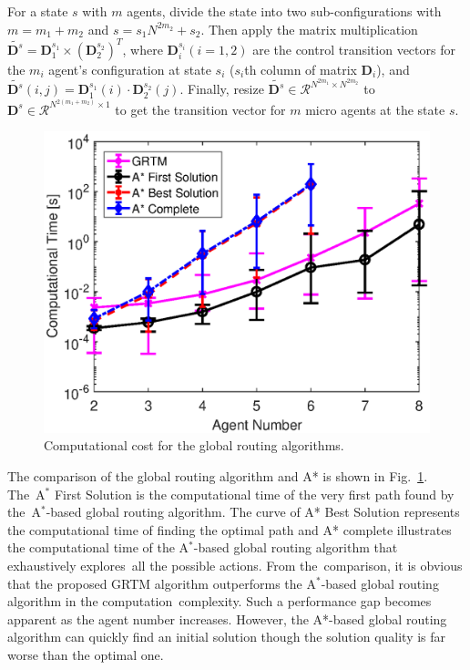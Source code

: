 \documentclass[conference, onecolumn]{IEEEtran}
\begin{document}
For a state $s$ with $m$ agents, divide the state into two sub-configurations with $m=m_1 + m_2$ and $s = s_1N^{2m_2}+s_2$. Then apply the matrix multiplication $\widetilde{\textbf{D}^s} = \textbf{D}_1^{s_1} \times (\textbf{D}_2^{s_2})^T$, where $\textbf{D}_i^{s_i}(i=1,2)$ are the control transition vectors for the $m_i$ agent's configuration at state $s_i$ ($s_i$th column of matrix $\textbf{D}_i$), and $\widetilde{\textbf{D}^s}(i,j) = \textbf{D}_1^{s_1}(i) \cdot \textbf{D}_2^{s_2}(j)$. Finally, resize $\widetilde{\textbf{D}^s}\in \mathcal{R}^{N^{2m_1} \times N^{2m_2}}$ to $\textbf{D}^s \in \mathcal{R}^{N^{2(m_1+m_2)} \times 1}$ to get the transition vector for $m$ micro agents at the state $s$.

\begin{figure}[thb!]

	\centering
	\includegraphics[scale=0.6]{globalroute}
	\caption{Computational cost for the global routing algorithms. }
	\label{globalroutefig}
\end{figure}


The comparison of the global routing algorithm and A* is shown in Fig.~\ref{globalroutefig}. The A$^*$ First Solution is the computational time of the very first path found by the A$^*$-based global routing algorithm. The curve of A* Best Solution represents the computational time of finding the optimal path and A* complete illustrates the computational time of the A$^*$-based global routing algorithm that exhaustively explores all the possible actions. From the comparison, it is obvious that the proposed GRTM algorithm outperforms the A$^*$-based global routing algorithm in the computation complexity. Such a performance gap becomes apparent as the agent number increases. However, the A*-based global routing algorithm can quickly find an initial solution though the solution quality is far worse than the optimal one. 
\end{document}
